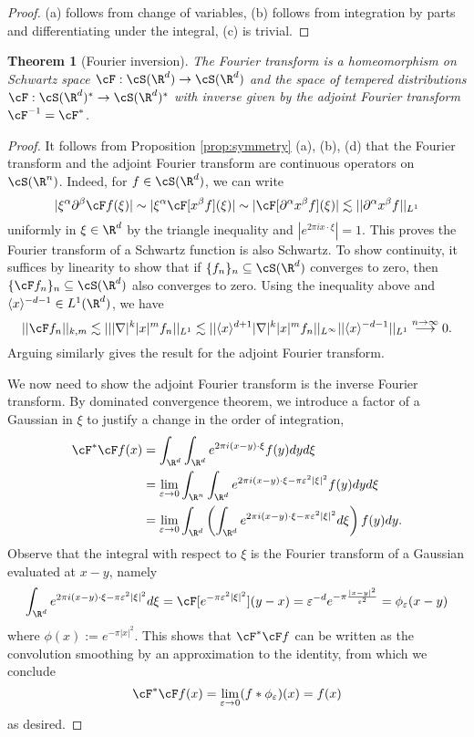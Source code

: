 \documentclass[reqno]{amsart}
\newtheorem{theorem}{Theorem}
\theoremstyle{definition}
\theoremstyle{remark}
\renewcommand{\epsilon}{\varepsilon}
\begin{document}
\begin{proof}
	(a) follows from change of variables, (b) follows from integration by parts and differentiating under the integral, (c) is trivial. 
\end{proof}

\begin{theorem}[Fourier inversion]
	The Fourier transform is a homeomorphism on Schwartz space $\cF: \cS (\R^d) \to \cS (\R^d)$ and the space of tempered distributions $\cF : \cS (\R^d)^* \to \cS (\R^d)^*$	 with inverse given by the adjoint Fourier transform $\cF^{-1} = \cF^*$. 
\end{theorem}
	
\begin{proof}
	It follows from Proposition \ref{prop:symmetry} (a), (b), (d) that the Fourier transform and the adjoint Fourier transform are continuous operators on $\cS (\R^n)$. Indeed, for $f \in \cS (\R^d)$, we can write
		\[ |\xi^\alpha \partial^\beta \cF f (\xi)| \sim |\xi^\alpha \cF [x^\beta f] (\xi)| \sim |\cF[\partial^\alpha x^\beta f] (\xi)| \lesssim || \partial^\alpha x^\beta f ||_{L^1} \]
	uniformly in $\xi \in \R^d$ by the triangle inequality and $|e^{2\pi i x \cdot \xi}| = 1$. This proves the Fourier transform of a Schwartz function is also Schwartz. To show continuity, it suffices by linearity to show that if $\{ f_n \}_n \subseteq \cS( \R^d)$ converges to zero, then $\{\cF f_n\}_n \subseteq \cS (\R^d)$ also converges to zero. Using the inequality above and $\langle x\rangle^{-d-1} \in L^1 (\R^d)$, we have
		\[ ||\cF f_n||_{k, m} \lesssim || |\nabla|^k |x|^m f_n||_{L^1} \lesssim || \langle x \rangle^{d + 1} |\nabla|^k |x|^m f_n||_{L^\infty} || \langle x \rangle^{-d - 1} ||_{L^1} \overset{n \to \infty}{\longrightarrow} 0.\]
	Arguing similarly gives the result for the adjoint Fourier transform. 
	
	We now need to show the adjoint Fourier transform is the inverse Fourier transform. By dominated convergence theorem, we introduce a factor of a Gaussian in $\xi$ to justify a change in the order of integration,
		\begin{align*}
			\cF^* \cF f (x)
				&= 
					\int_{\R^d} \int_{\R^d} e^{2\pi i (x - y)\cdot \xi} f(y) dy d\xi\\
				&= \lim_{\epsilon \to 0} 
					\int_{\R^n}  \int_{\R^d} e^{2\pi i (x - y) \cdot \xi - \pi \epsilon^2 |\xi|^2} f(y) dy d\xi \\
					&= \lim_{\epsilon \to 0} 
				\int_{\R^d}  \left(\int_{\R^d} e^{2\pi i (x - y) \cdot \xi - \pi \epsilon^2 |\xi|^2} d\xi\right) f(y) dy.
		\end{align*}	
	Observe that the integral with respect to $\xi$ is the Fourier transform of a Gaussian evaluated at $x - y$, namely
		\[ \int_{\R^d} e^{2\pi i (x - y) \cdot \xi - \pi \epsilon^2 |\xi|^2} d\xi = \cF[e^{-\pi \epsilon^2 |\xi|^2}] (y - x) = \epsilon^{-d} e^{-\pi \frac{|x - y|^2}{\epsilon^2}} = \phi_\epsilon (x - y) \]
	where $\phi (x) := e^{-\pi |x|^2}$. This shows that $\cF^* \cF f$ can be written as the convolution smoothing by an approximation to the identity, from which we conclude
		\[ \cF^* \cF f (x) = \lim_{\epsilon \to 0} (f * \phi_\epsilon) (x) = f(x) \]
	as desired. 
\end{proof}
\end{document}

